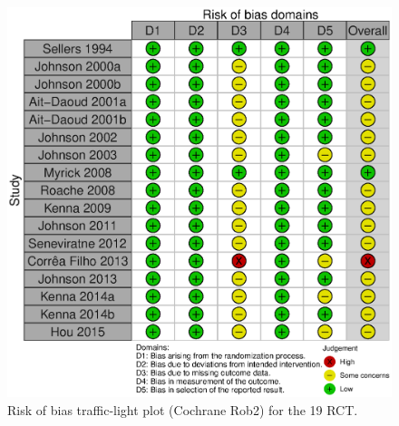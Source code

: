 \documentclass[twocolumn]{article}
\begin{document}
\newpage






\begin{figure}[t!]
\includegraphics[width=\columnwidth]{pictures/ROB2.eps}
\caption{Risk of bias traffic-light plot (Cochrane Rob2) for the 19 RCT.}
\label{fig:trafficlight}
\end{figure}

\end{document}
